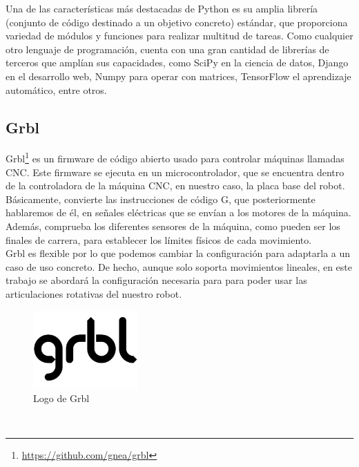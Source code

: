 Una de las características más destacadas de Python es su amplia librería (conjunto de código destinado a un objetivo concreto) estándar, que proporciona 
variedad de módulos y funciones para realizar multitud de tareas. Como cualquier otro lenguaje de programación, cuenta con una gran cantidad de librerías de terceros que 
amplían sus capacidades, como SciPy en la ciencia de datos, Django en el desarrollo web, Numpy para operar con matrices, TensorFlow el aprendizaje automático, entre otros.

\subsection{Grbl}
\label{subsec:grbl}
Grbl\footnote{\url{https://github.com/gnea/grbl}} es un firmware de código abierto usado para controlar máquinas llamadas \acs{CNC}. Este firmware se ejecuta en 
un microcontrolador, que se encuentra dentro de la controladora de la máquina \acs{CNC}, en nuestro caso, la placa base del robot. \\
Básicamente, convierte las instrucciones de código G, que posteriormente hablaremos de él, en señales eléctricas que se envían a los motores de la máquina. Además, 
comprueba los diferentes sensores de la máquina, como pueden ser los finales de carrera, para establecer los límites físicos de cada movimiento. \\
Grbl es flexible por lo que podemos cambiar la configuración para adaptarla a un caso de uso concreto. De hecho, aunque solo soporta movimientos lineales,
en este trabajo se abordará la configuración necesaria para para poder usar las articulaciones rotativas del nuestro robot.
\begin{figure} [h!]
  \begin{center}
    \includegraphics[width=4cm]{figs/grbl.png}
  \end{center}
  \caption{Logo de Grbl}
  \label{fig:grbllogo}
\end{figure}\ 
